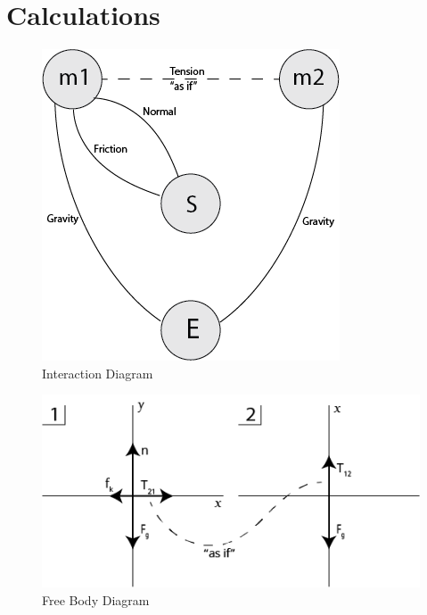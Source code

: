\documentclass[12pt]{article}
\begin{document}
    \section{Calculations}
        \begin{figure}[H]
            \centering
            \includegraphics[height=0.4\textheight]{Interaction Diagram.png}
            \caption{Interaction Diagram}
        \end{figure}
        \begin{figure}[H]
            \centering
            \includegraphics[width=\linewidth]{Free Body Diagram.png}
            \caption{Free Body Diagram}
        \end{figure}
\end{document}
